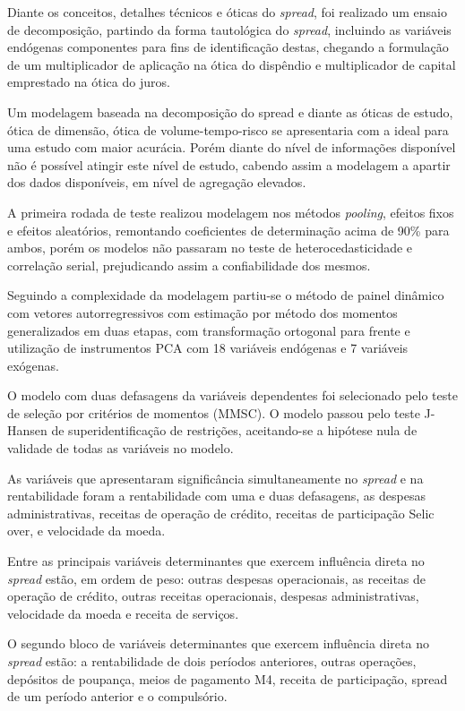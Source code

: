 \documentclass[
  12pt,
  12pt,
  openright,
  oneside,
  a4paper,
  chapter=TITLE,
  section=TITLE,
  subsection=TITLE,
  subsubsection=TITLE,
  english,
  portugues,
  sumario=tradicional]{abntex2}
\begin{document}
Diante os conceitos, detalhes técnicos e óticas do \emph{spread}, foi realizado um ensaio de decomposição, partindo da forma tautológica do \emph{spread}, incluindo as variáveis endógenas componentes para fins de identificação destas, chegando a formulação de um multiplicador de aplicação na ótica do dispêndio e multiplicador de capital emprestado na ótica do juros.

Um modelagem baseada na decomposição do spread e diante as óticas de estudo, ótica de dimensão, ótica de volume-tempo-risco se apresentaria com a ideal para uma estudo com maior acurácia. Porém diante do nível de informações disponível não é possível atingir este nível de estudo, cabendo assim a modelagem a apartir dos dados disponíveis, em nível de agregação elevados.

A primeira rodada de teste realizou modelagem nos métodos \emph{pooling}, efeitos fixos e efeitos aleatórios, remontando coeficientes de determinação acima de 90\% para ambos, porém os modelos não passaram no teste de heterocedasticidade e correlação serial, prejudicando assim a confiabilidade dos mesmos.

Seguindo a complexidade da modelagem partiu-se o método de painel dinâmico com vetores autorregressivos com estimação por método dos momentos generalizados em duas etapas, com transformação ortogonal para frente e utilização de instrumentos PCA com 18 variáveis endógenas e 7 variáveis exógenas.

O modelo com duas defasagens da variáveis dependentes foi selecionado pelo teste de seleção por critérios de momentos (MMSC). O modelo passou pelo teste J-Hansen de superidentificação de restrições, aceitando-se a hipótese nula de validade de todas as variáveis no modelo.

As variáveis que apresentaram significância simultaneamente no \emph{spread} e na rentabilidade foram a rentabilidade com uma e duas defasagens, as despesas administrativas, receitas de operação de crédito, receitas de participação Selic over, e velocidade da moeda.

Entre as principais variáveis determinantes que exercem influência direta no \emph{spread} estão, em ordem de peso: outras despesas operacionais, as receitas de operação de crédito, outras receitas operacionais, despesas administrativas, velocidade da moeda e receita de serviços.

O segundo bloco de variáveis determinantes que exercem influência direta no \emph{spread} estão: a rentabilidade de dois períodos anteriores, outras operações, depósitos de poupança, meios de pagamento M4, receita de participação, spread de um período anterior e o compulsório.
\end{document}
